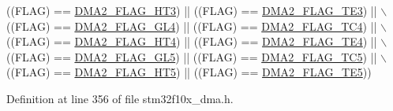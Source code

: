\begin{DoxyCode}
                               ((FLAG) == \hyperlink{group___d_m_a__flags__definition_ga1af48c549d9aa04e8161cb8b398ef39c}{DMA2\_FLAG\_HT3}) || ((FLAG) == 
      \hyperlink{group___d_m_a__flags__definition_gacdf472c665395a07681a7d499ac0f0bb}{DMA2\_FLAG\_TE3}) || \(\backslash\)
                               ((FLAG) == \hyperlink{group___d_m_a__flags__definition_ga624ff69707b76813a2170e4b1e0bda71}{DMA2\_FLAG\_GL4}) || ((FLAG) == 
      \hyperlink{group___d_m_a__flags__definition_gad4f76b7a22233dbb9daaad448c431165}{DMA2\_FLAG\_TC4}) || \(\backslash\)
                               ((FLAG) == \hyperlink{group___d_m_a__flags__definition_ga3dde40e2dbcdb12e4c1a2a2b5a8b3a60}{DMA2\_FLAG\_HT4}) || ((FLAG) == 
      \hyperlink{group___d_m_a__flags__definition_gac1178b804cad45fe82236dbd2c25cc64}{DMA2\_FLAG\_TE4}) || \(\backslash\)
                               ((FLAG) == \hyperlink{group___d_m_a__flags__definition_gab0468b7a6e2fbdd5428da87252865623}{DMA2\_FLAG\_GL5}) || ((FLAG) == 
      \hyperlink{group___d_m_a__flags__definition_ga5ba4dce652a1a29bedbd7d8dc35ca4ec}{DMA2\_FLAG\_TC5}) || \(\backslash\)
                               ((FLAG) == \hyperlink{group___d_m_a__flags__definition_ga23aabf34428e04d7b46368e0b595a4d5}{DMA2\_FLAG\_HT5}) || ((FLAG) == 
      \hyperlink{group___d_m_a__flags__definition_gae57659b4349d03eb70db63bb2aa40505}{DMA2\_FLAG\_TE5}))
\end{DoxyCode}


Definition at line 356 of file stm32f10x\+\_\+dma.\+h.


